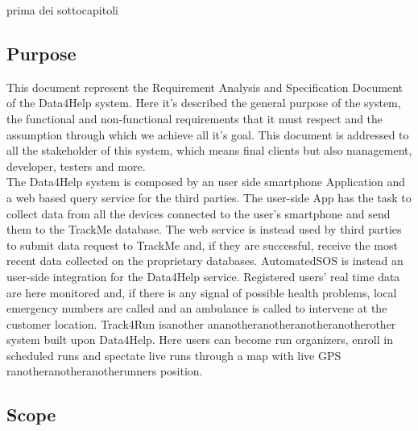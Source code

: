 prima dei sottocapitoli
\subsection{Purpose}
This document represent the Requirement Analysis and Specification Document of the Data4Help system. Here it's described the general purpose of the system, the functional and non-functional requirements that it must respect and the assumption through which we achieve all it's goal. This document is addressed to all the stakeholder of this system, which means final clients but also management, developer, testers and more.\\
The Data4Help system is composed by an user side smartphone Application and a web based query service for the third parties. The user-side App has the task to collect data from all the devices connected to the user's smartphone and send them to the TrackMe database. The web service is instead used by third parties to submit data request to TrackMe and, if they are successful, receive the most recent data collected on the proprietary databases.
AutomatedSOS is instead an user-side integration for the Data4Help service. Registered users' real time data are here monitored and, if there is any signal of possible health problems, local emergency numbers are called and an ambulance is called to intervene at the customer location.
Track4Run isanother ananotheranotheranotheranotherother system built upon Data4Help. Here users can become run organizers, enroll in scheduled runs and spectate live runs through a map with live GPS ranotheranotheranotherunners position.
\subsection{Scope}
